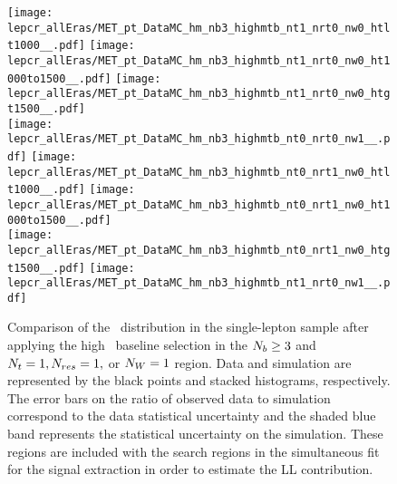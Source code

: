 \begin{figure}[!h]
	\begin{center}
  \texttt{[image: lepcr\_allEras/MET\_pt\_DataMC\_hm\_nb3\_highmtb\_nt1\_nrt0\_nw0\_htlt1000\_\_.pdf]}
  \texttt{[image: lepcr\_allEras/MET\_pt\_DataMC\_hm\_nb3\_highmtb\_nt1\_nrt0\_nw0\_ht1000to1500\_\_.pdf]} 
  \texttt{[image: lepcr\_allEras/MET\_pt\_DataMC\_hm\_nb3\_highmtb\_nt1\_nrt0\_nw0\_htgt1500\_\_.pdf]} \\
  \texttt{[image: lepcr\_allEras/MET\_pt\_DataMC\_hm\_nb3\_highmtb\_nt0\_nrt0\_nw1\_\_.pdf]} 
  \texttt{[image: lepcr\_allEras/MET\_pt\_DataMC\_hm\_nb3\_highmtb\_nt0\_nrt1\_nw0\_htlt1000\_\_.pdf]} 
  \texttt{[image: lepcr\_allEras/MET\_pt\_DataMC\_hm\_nb3\_highmtb\_nt0\_nrt1\_nw0\_ht1000to1500\_\_.pdf]}  \\
  \texttt{[image: lepcr\_allEras/MET\_pt\_DataMC\_hm\_nb3\_highmtb\_nt0\_nrt1\_nw0\_htgt1500\_\_.pdf]} 
  \texttt{[image: lepcr\_allEras/MET\_pt\_DataMC\_hm\_nb3\_highmtb\_nt1\_nrt0\_nw1\_\_.pdf]} \\
	\end{center}
	\caption[Lost Lepton HM Control Region $\nb\geq3$ with 1 heavy object]{Comparison of the \met~distribution in the single-lepton sample after applying the high \dm~baseline selection in the $\nb\geq3$ and $N_{t}=1, N_{res}=1,$ or $N_{W}=1$ region. Data and simulation are represented by the black points and stacked histograms, respectively. The error bars on the ratio of observed data to simulation correspond to the data statistical uncertainty and the shaded blue band represents the statistical uncertainty on the simulation. These regions are included with the search regions in the simultaneous fit for the signal extraction in order to estimate the LL contribution.
	 }
	\label{fig:llb-1lcr-datavsmc-hm-nb3-1}
\end{figure}

